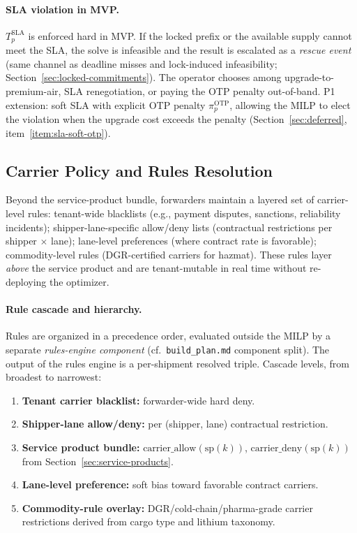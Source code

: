 \documentclass[11pt,a4paper]{article}
\theoremstyle{definition}
\begin{document}
\paragraph{SLA violation in MVP.}
$T_p^{\text{SLA}}$ is enforced hard in MVP. If the locked prefix or the available
supply cannot meet the SLA, the solve is infeasible and the result is escalated as
a \emph{rescue event} (same channel as deadline misses and lock-induced
infeasibility; Section~\ref{sec:locked-commitments}). The operator chooses among
upgrade-to-premium-air, SLA renegotiation, or paying the OTP penalty out-of-band.
P1 extension: soft SLA with explicit OTP penalty $\pi^{\text{OTP}}_p$, allowing the
MILP to elect the violation when the upgrade cost exceeds the penalty
(Section~\ref{sec:deferred}, item~\ref{item:sla-soft-otp}).

\subsection{Carrier Policy and Rules Resolution}
\label{sec:carrier-policy}

Beyond the service-product bundle, forwarders maintain a layered set of
carrier-level rules: tenant-wide blacklists (e.g., payment disputes, sanctions,
reliability incidents); shipper-lane-specific allow/deny lists (contractual
restrictions per shipper $\times$ lane); lane-level preferences (where contract rate
is favorable); commodity-level rules (DGR-certified carriers for hazmat). These
rules layer \emph{above} the service product and are tenant-mutable in real time
without re-deploying the optimizer.

\paragraph{Rule cascade and hierarchy.}
Rules are organized in a precedence order, evaluated outside the MILP by a separate
\emph{rules-engine component} (cf.\ \texttt{build\_plan.md} component split). The
output of the rules engine is a per-shipment resolved triple. Cascade levels, from
broadest to narrowest:
\begin{enumerate}[noitemsep]
  \item \textbf{Tenant carrier blacklist:} forwarder-wide hard deny.
  \item \textbf{Shipper-lane allow/deny:} per (shipper, lane) contractual restriction.
  \item \textbf{Service product bundle:} $\text{carrier\_allow}(\text{sp}(k))$,
        $\text{carrier\_deny}(\text{sp}(k))$ from Section~\ref{sec:service-products}.
  \item \textbf{Lane-level preference:} soft bias toward favorable contract carriers.
  \item \textbf{Commodity-rule overlay:} DGR/cold-chain/pharma-grade carrier restrictions
        derived from cargo type and lithium taxonomy.
\end{enumerate}
\end{document}
